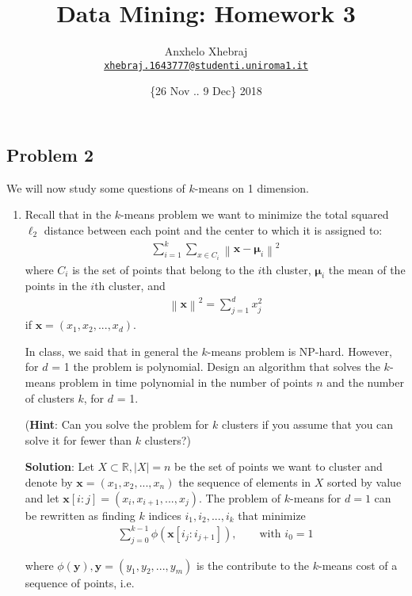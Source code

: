 \documentclass[a4paper]{article}
\title{Data Mining: Homework 3}
\author{Anxhelo Xhebraj \\
        \href{mailto:xhebraj.1643777@studenti.uniroma1.it}{\texttt{xhebraj.1643777@studenti.uniroma1.it}}
        }
\date{ \{26 Nov .. 9 Dec\} 2018}
\newcommand{\norm}[1]{\left\lVert#1\right\rVert}
\begin{document}
\maketitle

\subsection*{Problem 2}

We will now study some questions of $k$-means on 1 dimension.

\begin{enumerate}
  \item Recall that in the $k$-means problem we want to minimize the total
    squared $\ell_2$ distance between each point and the center to which it is
    assigned to:
    \begin{align*}
      \sum_{i = 1}^{k} \sum_{x \in C_i} \norm{\mathbf{x} - \boldsymbol{\mu}_i}^2
    \end{align*}
    where $C_i$ is the set of points that belong to the $i$th cluster,
    $\boldsymbol{\mu}_i$ the mean of the points in the $i$th cluster, and
    \begin{align*}
      \norm{\mathbf{x}}^2 = \sum_{j = 1}^d x_j^2
    \end{align*}
    if $\mathbf{x} = (x_1, x_2, ..., x_d)$.

    In class, we said that in general the $k$-means problem is NP-hard. However,
    for $d$ = 1 the problem is polynomial. Design an algorithm that solves the
    $k$-means problem in time polynomial in the number of points $n$ and the
    number of clusters $k$, for $d$ = 1.

    (\textbf{Hint}: Can you solve the problem for $k$ clusters if you assume
    that you can solve it for fewer than $k$ clusters?)

    \textbf{Solution}: Let $X \subset \mathbb{R}, |X| = n$ be the set of points we want
    to cluster and denote by $\mathbf{x} = (x_1, x_2, ..., x_n)$ the sequence of
    elements in $X$ sorted by value and let $\mathbf{x}[i:j] = (x_i, x_{i + 1}, ..., x_{j}) $.
    The problem of $k$-means for $d = 1$ can be rewritten as finding $k$ indices
    $i_1, i_2, ..., i_k$ that minimize
    \begin{align*}
      \sum_{j = 0}^{k - 1} \phi(\mathbf{x}[i_j:i_{j + 1}]), \qquad \text{with } i_0 =
      1
    \end{align*}

    where $\phi(\mathbf{y}), \mathbf{y} = (y_1, y_2, ..., y_m)$ is the
    contribute to the $k$-means cost of a sequence of points, i.e.
    

\end{enumerate}
\end{document}

